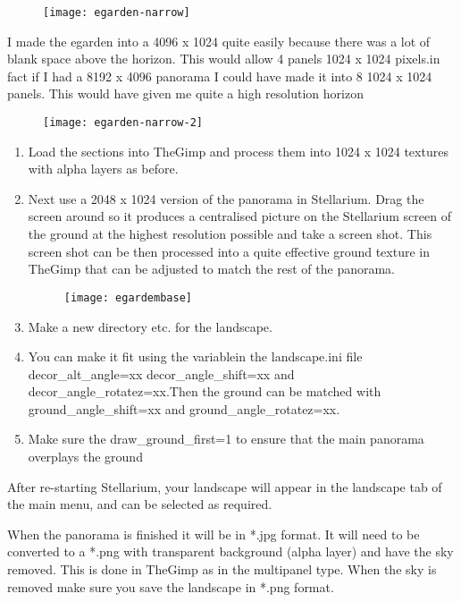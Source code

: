 \begin{figure}[h]
\centering\texttt{[image: egarden-narrow]}
\end{figure}

I made the egarden into a 4096 x 1024 quite easily because there was a
lot of blank space above the horizon. This would allow 4 panels 1024 x
1024 pixels.in fact if I had a 8192 x 4096 panorama I could have made it
into 8 1024 x 1024 panels. This would have given me quite a high
resolution horizon

\begin{figure}[h]
\centering\texttt{[image: egarden-narrow-2]}
\end{figure}


\begin{enumerate}
\item
  Load the sections into TheGimp and process them into 1024 x 1024
  textures with alpha layers as before.
\item
  Next use a 2048 x 1024 version of the panorama in Stellarium. Drag the
  screen around so it produces a centralised picture on the Stellarium
  screen of the ground at the highest resolution possible and take a
  screen shot. This screen shot can be then processed into a quite
  effective ground texture in TheGimp that can be adjusted to match the
  rest of the panorama.
  \begin{figure}[h]
  \centering\texttt{[image: egardembase]}
  \end{figure}
\item
  Make a new directory etc. for the landscape.
\item
  You can make it fit using the variablein the landscape.ini file
  decor\_alt\_angle=xx decor\_angle\_shift=xx and
  decor\_angle\_rotatez=xx.Then the ground can be matched with
  ground\_angle\_shift=xx and ground\_angle\_rotatez=xx.
\item
  Make sure the draw\_ground\_first=1 to ensure that the main panorama
  overplays the ground
\end{enumerate}

After re-starting Stellarium, your landscape will appear in the
landscape tab of the main menu, and can be selected as required.

When the panorama is finished it will be in *.jpg format. It will need
to be converted to a *.png with transparent background (alpha layer) and
have the sky removed. This is done in TheGimp as in the multipanel type.
When the sky is removed make sure you save the landscape in *.png
format.

